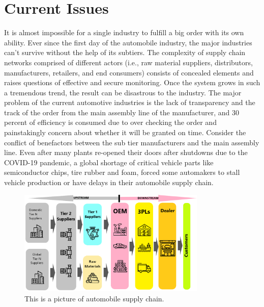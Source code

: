 \documentclass[12pt]{article}
\begin{document}
\section{Current Issues} \label{issues}
It is almost impossible for a single industry to fulfill a big order with its own ability. 
Ever since the first day of the automobile industry, the major industries 
can't survive without the help of its subtiers. The complexity of supply chain networks comprised
of different actors (i.e., raw material suppliers, distributors, manufacturers, retailers, and
end consumers) consists of concealed elements and raises questions of effective and secure 
monitoring. \cite{francisco2018supply}
Once the system grows in such a tremendous trend, the result can be disastrous 
to the industry.\cite{edi} The major problem of the current automotive
industries is the lack of transparency and the track of the order from the main 
assembly line
of the manufacturer, and 30 percent of efficiency is consumed due to over 
checking the order
and painstakingly concern about whether it will be granted on time. 
Consider the conflict of benefactors between the sub tier 
manufacturers and the main assembly line. 
Even after many plants
re-opened their doors after shutdowns due to the COVID-19 pandemic, a global 
shortage of critical
vehicle parts like semiconductor chips, tire rubber and foam, 
forced some automakers to stall vehicle production or have delays in their
automobile supply chain. 
\begin{figure}
\centering
\includegraphics[width=0.8\textwidth]{tiers.png}
\caption{\label{fig:tiers}This is a picture of automobile supply chain.}
\end{figure}
\end{document}
